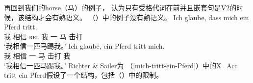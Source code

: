 再回到我们的horse（马）的例子， \citet[]{RS2009a}认为只有受格代词在前并且嵌套句是V2的时候，该结构才会有熟语义。 （）中的例子没有熟语义。
\eal
\ex 
\gll Ich glaube, dass mich ein Pferd tritt.\\
     我 相信   \textsc{rel} 我   一 马   击打\\
\glt `我相信一匹马踢我。'
\ex 
\gll Ich glaube, ein Pferd tritt mich.\\
    我 相信   一 马   击打 我\\
\glt `我相信一匹马踢我。'
\zl
Richter \& Sailer为 （\ref{mich-tritt-ein-Pferd}）中的X\_Acc tritt ein Pferd假设了一个结构，包括（）中的限制。

